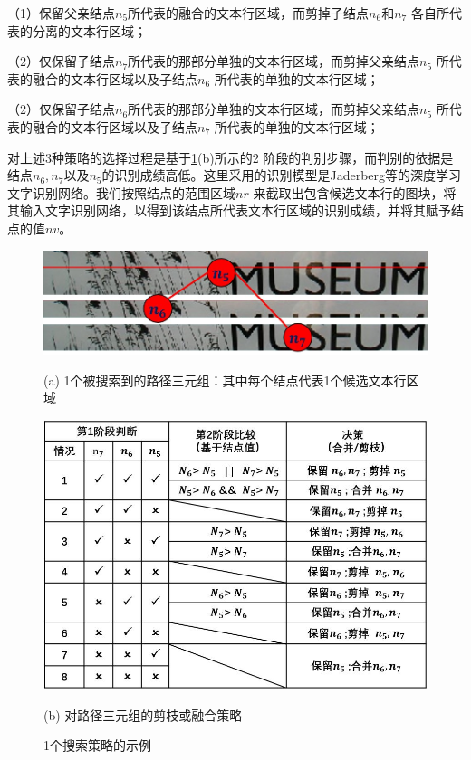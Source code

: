         （1）保留父亲结点$n_5$所代表的融合的文本行区域，而剪掉子结点$n_6$和$n_7$ 各自所代表的分离的文本行区域；

        （2）仅保留子结点$n_7$所代表的那部分单独的文本行区域，而剪掉父亲结点$n_5$ 所代表的融合的文本行区域以及子结点$n_6$ 所代表的单独的文本行区域；

        （2）仅保留子结点$n_6$所代表的那部分单独的文本行区域，而剪掉父亲结点$n_5$ 所代表的融合的文本行区域以及子结点$n_7$ 所代表的单独的文本行区域；

        对上述3种策略的选择过程是基于\ref{fig.c4_search_strategy}(b)所示的2 阶段的判别步骤，而判别的依据是结点$n_6,n_7$以及$n_5$的识别成绩高低。这里采用的识别模型是Jaderberg等\cite{Jaderberg2016Reading}的深度学习文字识别网络。我们按照结点的范围区域$nr$ 来截取出包含候选文本行的图块，将其输入文字识别网络，以得到该结点所代表文本行区域的识别成绩，并将其赋予结点的值$nv$。

        \begin{figure}[!h]
        \centering
        \includegraphics[width=\textwidth]{./figures/c4_search_strategy1.jpg}
        \centerline{\small (a) 1个被搜索到的路径三元组：其中每个结点代表1个候选文本行区域 }
        \includegraphics[width=\textwidth]{./figures/c4_search_strategy2.jpg}
        \centerline{\small (b) 对路径三元组的剪枝或融合策略}
        \caption{ 1个搜索策略的示例}
        \label{fig.c4_search_strategy}
        \end{figure}

